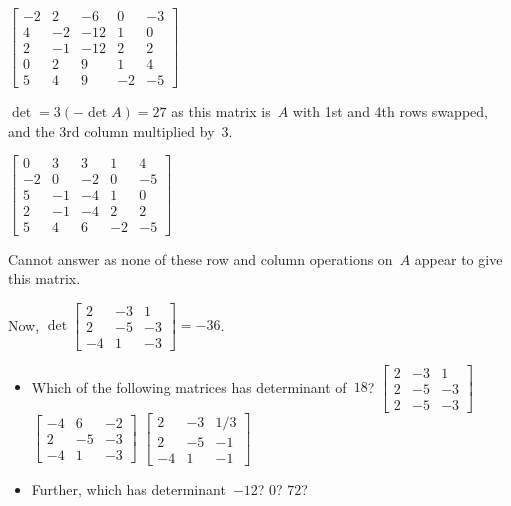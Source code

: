 \begin{example}
\begin{Parts}
\begin{reduce}
\item \(\begin{bmatrix}-2&2&-6&0&-3
\\4&-2&-12&1&0
\\2&-1&-12&2&2
\\0&2&9&1&4
\\5&4&9&-2&-5\end{bmatrix}\)
\begin{solution} 
\(\det=3(-\det A)=27\) as this matrix is~\(A\) with 1st and 4th rows swapped, and the 3rd column multiplied by~\(3\). 
\end{solution}

\item \(\begin{bmatrix}0&3&3&1&4
\\-2&0&-2&0&-5
\\5&-1&-4&1&0
\\2&-1&-4&2&2
\\5&4&6&-2&-5\end{bmatrix}\)
\begin{solution} 
Cannot answer as none of these row and column operations on~\(A\) appear to give this matrix.
\end{solution}
\end{reduce}

\end{Parts}
\end{example}




\begin{activity}
Now, \(\det\begin{bmatrix} 2&-3&1
\\2&-5&-3
\\-4&1&-3 \end{bmatrix}=-36\). 
\begin{itemize}
\item Which of the following matrices has determinant of~\(18\)?
{\(\begin{bmatrix} 2&-3&1
\\2&-5&-3
\\2&-5&-3 \end{bmatrix}\)}
{\(\begin{bmatrix} -4&6&-2
\\2&-5&-3
\\-4&1&-3 \end{bmatrix}\)}
{\(\begin{bmatrix} 2&-3&1/3
\\2&-5&-1
\\-4&1&-1 \end{bmatrix}\)}
\item Further, which has determinant~\(-12\)? \(0\)? \(72\)?
\end{itemize}
\end{activity}



